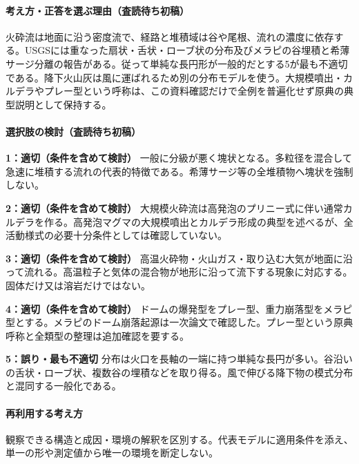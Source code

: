 \paragraph{考え方・正答を選ぶ理由（査読待ち初稿）} 火砕流は地面に沿う密度流で、経路と堆積域は谷や尾根、流れの濃度に依存する。USGSには重なった扇状・舌状・ローブ状の分布及びメラピの谷埋積と希薄サージ分離の報告がある。従って単純な長円形が一般的だとする5が最も不適切である。降下火山灰は風に運ばれるため別の分布モデルを使う。大規模噴出・カルデラやプレー型という呼称は、この資料確認だけで全例を普遍化せず原典の典型説明として保持する。

\paragraph{選択肢の検討（査読待ち初稿）}\mbox{}\par

\noindent\textbf{1：適切（条件を含めて検討）} 一般に分級が悪く塊状となる。多粒径を混合して急速に堆積する流れの代表的特徴である。希薄サージ等の全堆積物へ塊状を強制しない。\par

\noindent\textbf{2：適切（条件を含めて検討）} 大規模火砕流は高発泡のプリニー式に伴い通常カルデラを作る。高発泡マグマの大規模噴出とカルデラ形成の典型を述べるが、全活動様式の必要十分条件としては確認していない。\par

\noindent\textbf{3：適切（条件を含めて検討）} 高温火砕物・火山ガス・取り込む大気が地面に沿って流れる。高温粒子と気体の混合物が地形に沿って流下する現象に対応する。固体だけ又は溶岩だけではない。\par

\noindent\textbf{4：適切（条件を含めて検討）} ドームの爆発型をプレー型、重力崩落型をメラピ型とする。メラピのドーム崩落起源は一次論文で確認した。プレー型という原典呼称と全類型の整理は追加確認を要する。\par

\noindent\textbf{5：誤り・最も不適切} 分布は火口を長軸の一端に持つ単純な長円が多い。谷沿いの舌状・ローブ状、複数谷の埋積などを取り得る。風で伸びる降下物の模式分布と混同する一般化である。\par

\paragraph{再利用する考え方} 観察できる構造と成因・環境の解釈を区別する。代表モデルに適用条件を添え、単一の形や測定値から唯一の環境を断定しない。


